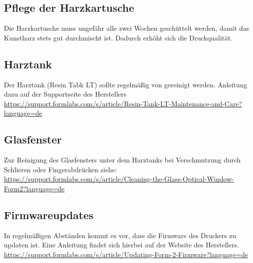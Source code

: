 \documentclass{\basedir/fablab-document}
\begin{document}
\subsection{Pflege der Harzkartusche}
Die Harzkartusche muss ungefähr alle zwei Wochen geschüttelt werden, damit das Kunstharz stets gut durchmischt ist. Dadurch erhöht sich die Druckqualität.

\subsection{Harztank}
Der Harztank (Resin Tabk LT) sollte regelmäßig von gereinigt werden. Anleitung dazu auf der Supportseite des Herstellers\\
\url{https://support.formlabs.com/s/article/Resin-Tank-LT-Maintenance-and-Care?language=de}

\subsection{Glasfenster}
Zur Reinigung des Glasfensters unter dem Harztanks bei Verschmutzung durch Schlieren oder Fingerabdrücken siehe:\\ \url{https://support.formlabs.com/s/article/Cleaning-the-Glass-Optical-Window-Form2?language=de}

\subsection{Firmwareupdates}

In regelmäßigen Abständen kommt es vor, dass die Firmware des Druckers zu updaten ist. Eine Anleitung findet sich hierbei auf der Website des Herstellers.\\
\url{https://support.formlabs.com/s/article/Updating-Form-2-Firmware?language=de}

\end{document}
